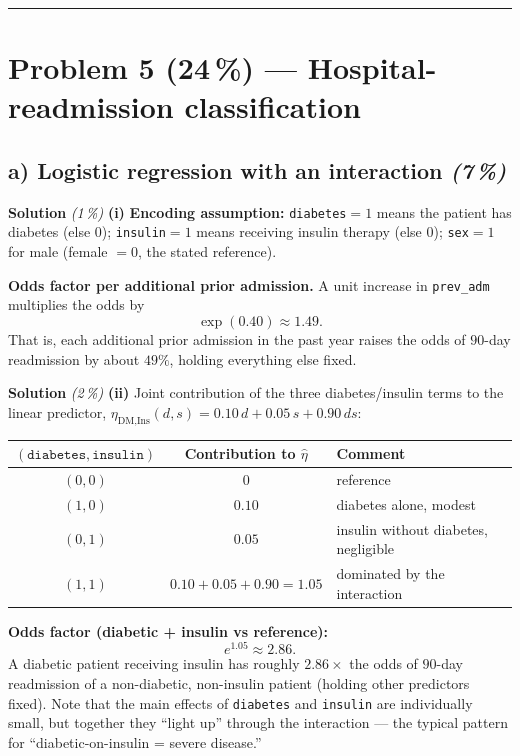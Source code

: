 \documentclass[11pt,a4paper]{article}
\newcommand{\points}[1]{\textbf{(#1\,\%)}}
\newcommand{\subpoints}[1]{\textit{(#1\,\%)}}
\newcommand{\sol}{\noindent\textbf{Solution}}
\begin{document}
\vspace{0.6em}
\hrule
\vspace{1em}

\section*{Problem 5 \points{24} --- Hospital-readmission classification}

\subsection*{a) Logistic regression with an interaction \subpoints{7}}

\sol{} \subpoints{1} \textbf{(i)} \textbf{Encoding assumption:} \texttt{diabetes}$=1$ means the
patient has diabetes (else $0$); \texttt{insulin}$=1$ means receiving insulin therapy (else $0$);
\texttt{sex}$=1$ for male (female $=0$, the stated reference).

\textbf{Odds factor per additional prior admission.} A unit increase in \texttt{prev\_adm}
multiplies the odds by
$$\exp(0.40) \approx \boxed{1.49}.$$
That is, each additional prior admission in the past year raises the odds of $90$-day readmission
by about $49\%$, holding everything else fixed.

\medskip
\sol{} \subpoints{2} \textbf{(ii)} Joint contribution of the three diabetes/insulin terms to the
linear predictor, $\eta_{\text{DM,Ins}}(d, s) = 0.10\,d + 0.05\,s + 0.90\,d s$:
\begin{center}
\begin{tabular}{ccl}
\toprule
$(\texttt{diabetes}, \texttt{insulin})$ & Contribution to $\hat\eta$ & Comment \\
\midrule
$(0,0)$ & $0$                          & reference \\
$(1,0)$ & $0.10$                       & diabetes alone, modest \\
$(0,1)$ & $0.05$                       & insulin without diabetes, negligible \\
$(1,1)$ & $0.10 + 0.05 + 0.90 = 1.05$  & dominated by the interaction \\
\bottomrule
\end{tabular}
\end{center}

\textbf{Odds factor (diabetic + insulin vs reference):}
$$e^{1.05} \approx \boxed{2.86}.$$
A diabetic patient receiving insulin has roughly $2.86\times$ the odds of $90$-day readmission of
a non-diabetic, non-insulin patient (holding other predictors fixed). Note that the main effects
of \texttt{diabetes} and \texttt{insulin} are individually small, but together they ``light up''
through the interaction --- the typical pattern for ``diabetic-on-insulin = severe disease.''
\end{document}
